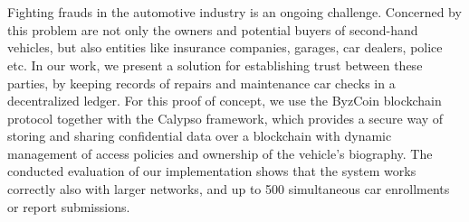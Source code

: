 

\thispagestyle{empty}

\section*{ \\[30pt]} 

\begin{itshape}
Fighting frauds in the automotive industry is an ongoing challenge. Concerned by this problem are not only the owners and potential buyers of second-hand vehicles, but also entities like insurance companies, garages, car dealers, police etc.
In our work, we present a solution for establishing trust between these parties, by keeping records of repairs and maintenance car checks in a decentralized ledger. For this proof of concept, we use the ByzCoin \cite{ByzCoin} blockchain protocol together with the Calypso \cite{Calypso} framework, which provides a secure way of storing and sharing confidential data over a blockchain with dynamic management of access policies and ownership of the vehicle's biography.
The conducted evaluation of our implementation shows that the system works correctly also with larger networks, and up to 500 simultaneous car enrollments or report submissions.
\end{itshape}